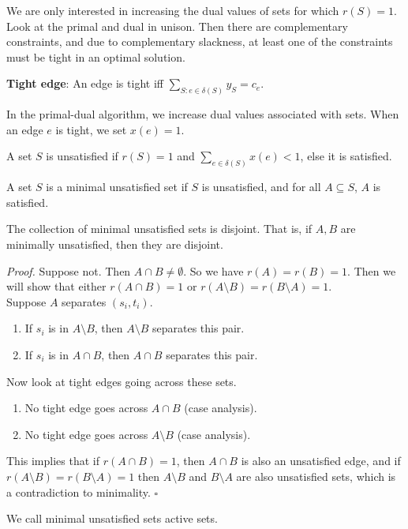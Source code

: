 \documentclass[a4paper]{article}
\newenvironment{proof}{\begin{breakbox}\textit{Proof.}}{\hfill$\square$\end{breakbox}}
\newcommand{\nl}{\vspace{0.2cm}\\}
\begin{document}
We are only interested in increasing the dual values of sets for which $r(S) = 1$.\nl
Look at the primal and dual in unison. Then there are complementary constraints, and due to complementary slackness, at least one of the constraints must be tight in an optimal solution.\nl
\begin{defn}
    \textbf{Tight edge}: An edge is tight iff $\sum_{S : e \in \delta(S)} y_S = c_e$.
\end{defn}
In the primal-dual algorithm, we increase dual values associated with sets. When an edge $e$ is tight, we set $x(e) = 1$.\nl
\begin{defn}
    A set $S$ is unsatisfied if $r(S) = 1$ and $\sum_{e \in \delta(S)} x(e) < 1$, else it is satisfied.
\end{defn}
\begin{defn}
    A set $S$ is a minimal unsatisfied set if $S$ is unsatisfied, and for all $A \subseteq S$, $A$ is satisfied.
\end{defn}
\begin{claim}
    The collection of minimal unsatisfied sets is disjoint. That is, if $A, B$ are minimally unsatisfied, then they are disjoint.
\end{claim}
\begin{proof}
    Suppose not. Then $A \cap B \ne \emptyset$. So we have $r(A) = r(B) = 1$. Then we will show that either $r(A \cap B) = 1$ or $r(A \setminus B) = r(B \setminus A) = 1$.\nl
    Suppose $A$ separates $(s_i, t_i)$.
    \begin{enumerate}
        \item If $s_i$ is in $A \setminus B$, then $A \setminus B$ separates this pair.
        \item If $s_i$ is in $A \cap B$, then $A \cap B$ separates this pair.
    \end{enumerate}
    Now look at tight edges going across these sets.
    \begin{enumerate}
        \item No tight edge goes across $A \cap B$ (case analysis).
        \item No tight edge goes across $A \setminus B$ (case analysis).
    \end{enumerate}
    This implies that if $r(A \cap B) = 1$, then $A \cap B$ is also an unsatisfied edge, and if $r(A \setminus B) = r(B \setminus A) = 1$ then $A \setminus B$ and $B \setminus A$ are also
    unsatisfied sets, which is a contradiction to minimality.
\end{proof}
We call minimal unsatisfied sets active sets.\nl
\end{document}
